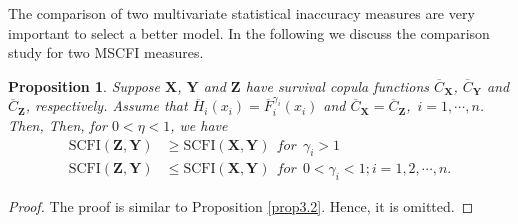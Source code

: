 \documentclass[12pt, a4paper]{article}
\numberwithin{equation}{section}
\newtheorem{proposition}{Proposition}[section]
\begin{document}
The comparison of two multivariate statistical inaccuracy measures are very important to select a better model. In the following we discuss the comparison study for two MSCFI measures. 

\begin{proposition}\label{prop4.3}
Suppose $\textbf{X}$, $\textbf{Y}$ and $\textbf{Z}$ have survival copula functions $\overline C_\textbf{X}$, $\overline C_\textbf{Y}$ and $\overline C_\textbf{Z}$, respectively. Assume that $\overline H_i(x_i)=\overline F_i^{\gamma_i}(x_i)$ and $\overline C_{\textbf{X}}=\overline C_{\textbf{Z}}$,~$i=1,\cdots,n$. Then, 
Then, for \(0 < \eta < 1\), we have  
\begin{align*}
	\text{SCFI}(\mathbf{Z}, \mathbf{Y}) &\ge \text{SCFI}(\mathbf{X}, \mathbf{Y})~~for~~\gamma_i>1\\
	\text{SCFI}(\mathbf{Z}, \mathbf{Y}) &\le \text{SCFI}(\mathbf{X}, \mathbf{Y})~~for~~0<\gamma_i<1; i=1,2,\cdots,n.
\end{align*}  
\end{proposition}
\begin{proof}
The proof is similar to Proposition \ref{prop3.2}. Hence, it is omitted.
\end{proof}
\end{document}
